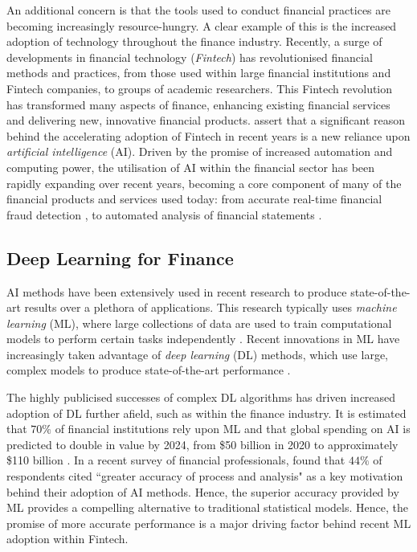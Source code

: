 \documentclass[a4paper, 11pt]{report}
\begin{document}
    An additional concern is that the tools used to conduct financial practices are becoming increasingly resource-hungry. A clear example of this is the increased adoption of technology throughout the finance industry. Recently, a surge of developments in financial technology (\emph{Fintech}) has revolutionised financial methods and practices, from those used within large financial institutions and Fintech companies, to groups of academic researchers. This Fintech revolution has transformed many aspects of finance, enhancing existing financial services and delivering new, innovative financial products. \citet{palmie-2020} assert that a significant reason behind the accelerating adoption of Fintech in recent years is a new reliance upon \emph{artificial intelligence} (AI). Driven by the promise of increased automation and computing power, the utilisation of AI within the financial sector has been rapidly expanding over recent years, becoming a core component of many of the financial products and services used today: from accurate real-time financial fraud detection \citep{sadgali-2019}, to automated analysis of financial statements \citep{amel-2020}.


    \subsection{Deep Learning for Finance}

    AI methods have been extensively used in recent research to produce state-of-the-art results over a plethora of applications. This research typically uses \emph{machine learning} (ML), where large collections of data are used to train computational models to perform certain tasks independently \citep{samuel-1959}. Recent innovations in ML have increasingly taken advantage of \emph{deep learning} (DL) methods, which use large, complex models to produce state-of-the-art performance \citep{witten-2017}.

    The highly publicised successes of complex DL algorithms has driven increased adoption of DL further afield, such as within the finance industry. It is estimated that $70\%$ of financial institutions rely upon ML \citep{gokhale-2019} and that global spending on AI is predicted to double in value by 2024, from \$50 billion in 2020 to approximately \$110 billion \citep{oecd-2021}. In a recent survey of financial professionals, \citet{chartis-2019} found that $44\%$ of respondents cited ``greater accuracy of process and analysis" as a key motivation behind their adoption of AI methods. Hence, the superior accuracy provided by ML provides a compelling alternative to traditional statistical models. Hence, the promise of more accurate performance is a major driving factor behind recent ML adoption within Fintech.
\end{document}
